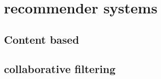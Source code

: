 







\section{recommender systems}
\subsection{Content based}
\subsection{collaborative filtering}


